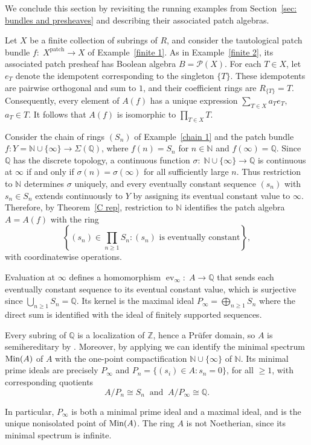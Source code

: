 \documentclass[11pt]{amsart}
\begin{document}
We conclude this section by revisiting the running examples from Section~\ref{sec: bundles and presheaves} and describing their associated patch algebras.

\begin{example}\label{finite 3}
Let $X$ be a finite collection of subrings of $R$, and consider the tautological patch bundle $f\colon\; X^{\mathrm{patch}}\to X$ of
Example~\ref{finite 1}. As in Example~\ref{finite 2}, its associated patch presheaf has Boolean algebra $B=\mathcal P(X)$. For each $T\in X$, let $e_T$ denote the idempotent corresponding to the singleton $\{T\}$. These idempotents are pairwise orthogonal and sum to $1$, and their coefficient rings are $R_{\{T\}}=T$. Consequently, every element of $A(f)$ has a
unique expression $\sum_{T\in X}a_Te_T,$ $a_T\in T.$ It follows that $A(f)$ is isomorphic to $\prod_{T\in X}T$.
\end{example} 


\begin{example}\label{chain 3}
Consider the chain of rings $(S_n)$ of Example~\ref{chain 1} and the patch bundle $f\colon Y=\mathbb N\cup\{\infty\}\to\Sigma(\mathbb Q)$, where
$f(n)=S_n$ for $n\in\mathbb N$ and $f(\infty)=\mathbb Q$.
Since $\mathbb Q$ has the discrete topology, a continuous function $\sigma\colon \; \mathbb N \cup \{\infty\}\to \mathbb Q$ is continuous at $\infty$ if and only if $\sigma(n)=\sigma(\infty)$ for all sufficiently large $n$. Thus restriction to $\mathbb N$ determines $\sigma$ uniquely, and every eventually constant sequence $(s_n)$ with $s_n\in S_n$ extends continuously to $Y$ by assigning its eventual constant value to $\infty$.
Therefore, by Theorem~\ref{C rep}, restriction to $\mathbb N$ identifies the patch algebra $A=A(f)$ with the ring
$$\left\{ (s_n)\in\prod_{n\ge1}S_n: (s_n)\text{ is eventually constant} \right\},$$
with coordinatewise operations.  

Evaluation at $\infty$ defines a homomorphism $\operatorname{ev}_\infty\colon\;  A\to\mathbb Q$ that sends each eventually constant sequence to its eventual constant value, which is surjective since $\bigcup_{n\geq1}S_n=\mathbb Q$.
Its kernel is the maximal ideal $P_\infty = \bigoplus_{n\ge1}S_n$ where the direct sum is identified with the ideal of finitely supported sequences.

Every subring of $\mathbb Q$ is a localization of $\mathbb Z$, hence a Pr\"ufer domain, so $A$ is semihereditary by \cite[Corollary~7.2]{CosOlb}. Moreover, by applying  \cite[Theorem~6.9 and Proposition~7.4]{CosOlb} we can identify the minimal spectrum $\mbox{\rm Min} (A)$ of $A$ with the one-point compactification $\mathbb N\cup\{\infty\}$ of ${\mathbb N}$. Its minimal prime ideals are precisely
$P_\infty$ and $P_n=\{(s_i)\in A:s_n=0\}$, for all $\geq1$, with corresponding quotients
\[
A/P_n\cong S_n \: {\mbox{ and }} \: A/P_\infty\cong\mathbb Q.
\]

In particular, $P_\infty$ is both a minimal prime ideal and a maximal ideal, and is the unique nonisolated point of
$\mbox{\rm Min}(A)$. The ring $A$ is not Noetherian, since its minimal spectrum is infinite.
\end{example}
\end{document}
